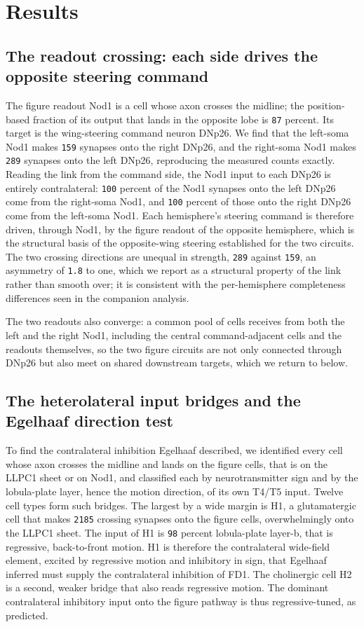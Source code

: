 \documentclass[11pt]{article}
\newcommand{\rid}[1]{\texttt{\small #1}}
\begin{document}
\section{Results}

\subsection{The readout crossing: each side drives the opposite steering command}

The figure readout Nod1 is a cell whose axon crosses the midline; the position-based fraction of
its output that lands in the opposite lobe is \rid{87} percent. Its target is the wing-steering
command neuron DNp26. We find that the left-soma Nod1 makes \rid{159} synapses onto the right
DNp26, and the right-soma Nod1 makes \rid{289} synapses onto the left DNp26, reproducing the
measured counts exactly. Reading the link from the command side, the Nod1 input to each DNp26 is
entirely contralateral: \rid{100} percent of the Nod1 synapses onto the left DNp26 come from the
right-soma Nod1, and \rid{100} percent of those onto the right DNp26 come from the left-soma Nod1.
Each hemisphere's steering command is therefore driven, through Nod1, by the figure readout of the
opposite hemisphere, which is the structural basis of the opposite-wing steering established for
the two circuits. The two crossing directions are unequal in strength, \rid{289} against
\rid{159}, an asymmetry of \rid{1.8} to one, which we report as a structural property of the link
rather than smooth over; it is consistent with the per-hemisphere completeness differences seen
in the companion analysis.

The two readouts also converge: a common pool of cells receives from both the left and the right
Nod1, including the central command-adjacent cells and the readouts themselves, so the two figure
circuits are not only connected through DNp26 but also meet on shared downstream targets, which we
return to below.

\subsection{The heterolateral input bridges and the Egelhaaf direction test}

To find the contralateral inhibition Egelhaaf described, we identified every cell whose axon
crosses the midline and lands on the figure cells, that is on the LLPC1 sheet or on Nod1, and
classified each by neurotransmitter sign and by the lobula-plate layer, hence the motion
direction, of its own T4/T5 input. Twelve cell types form such bridges. The largest by a wide
margin is H1, a glutamatergic cell that makes \rid{2185} crossing synapses onto the figure cells,
overwhelmingly onto the LLPC1 sheet. The input of H1 is \rid{98} percent lobula-plate layer-b,
that is regressive, back-to-front motion. H1 is therefore the contralateral wide-field element,
excited by regressive motion and inhibitory in sign, that Egelhaaf inferred must supply the
contralateral inhibition of FD1. The cholinergic cell H2 is a second, weaker bridge that also
reads regressive motion. The dominant contralateral inhibitory input onto the figure pathway is
thus regressive-tuned, as predicted.
\end{document}
